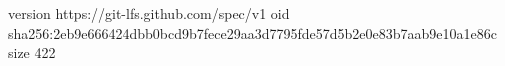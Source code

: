 version https://git-lfs.github.com/spec/v1
oid sha256:2eb9e666424dbb0bcd9b7fece29aa3d7795fde57d5b2e0e83b7aab9e10a1e86c
size 422
